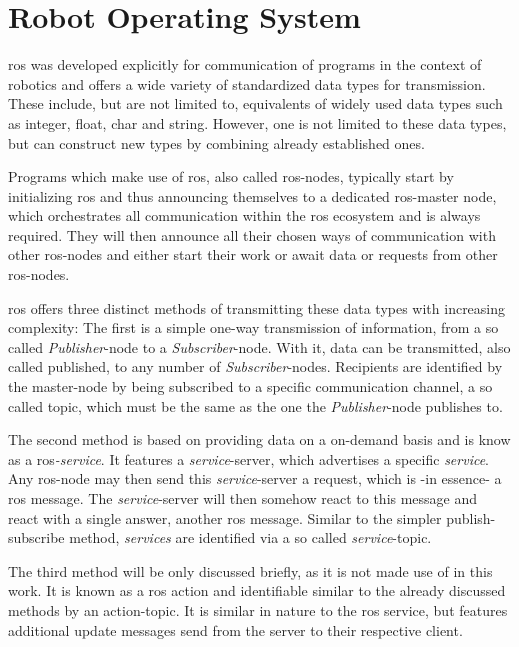 \section{Robot Operating System}
\label{intro:ros}
\gls{ros} \cite{288} was developed explicitly for communication of programs in the context of robotics and offers a wide variety of standardized data types for transmission.
These include, but are not limited to, equivalents of widely used data types such as integer, float, char and string.
However, one is not limited to these data types, but can construct new types by combining already established ones.

Programs which make use of \gls{ros}, also called \gls{ros}-nodes, typically start by initializing \gls{ros} and thus announcing themselves to a dedicated \gls{ros}-master node, which orchestrates all communication within the \gls{ros} ecosystem and is always required.
They will then announce all their chosen ways of communication with other \gls{ros}-nodes and either start their work or await data or requests from other \gls{ros}-nodes.

\gls{ros} offers three distinct methods of transmitting these data types with increasing complexity:
The first is a simple one-way transmission of information, from a so called \textit{Publisher}-node to a \textit{Subscriber}-node.
With it, data can be transmitted, also called published, to any number of \textit{Subscriber}-nodes.
Recipients are identified by the master-node by being subscribed to a specific communication channel, a so called topic, which must be the same as the one the \textit{Publisher}-node publishes to.

The second method is based on providing data on a on-demand basis and is know as a \gls{ros}\textit{-service}.
It features a \textit{service}-server, which advertises a specific \textit{service}.
Any \gls{ros}-node may then send this \textit{service}-server a request, which is -in essence- a \gls{ros} message.
The \textit{service}-server will then somehow react to this message and react with a single answer, another \gls{ros} message.
Similar to the simpler publish-subscribe method, \textit{services} are identified via a so called \textit{service}-topic.

The third method will be only discussed briefly, as it is not made use of in this work.
It is known as a \gls{ros} action and identifiable similar to the already discussed methods by an action-topic.
It is similar in nature to the \gls{ros} service, but features additional update messages send from the server to their respective client.

